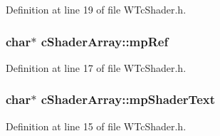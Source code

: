 Definition at line 19 of file WTcShader.h.

\hypertarget{classc_shader_array_af44e6ae486efc2576faa43df52d14e33}{
\subsubsection[{mpRef}]{\setlength{\rightskip}{0pt plus 5cm}char$\ast$ {\bf cShaderArray::mpRef}}}
\label{classc_shader_array_af44e6ae486efc2576faa43df52d14e33}


Definition at line 17 of file WTcShader.h.

\hypertarget{classc_shader_array_a17b2519868bbc5a40db2222a42a6dd84}{
\subsubsection[{mpShaderText}]{\setlength{\rightskip}{0pt plus 5cm}char$\ast$ {\bf cShaderArray::mpShaderText}}}
\label{classc_shader_array_a17b2519868bbc5a40db2222a42a6dd84}


Definition at line 15 of file WTcShader.h.

